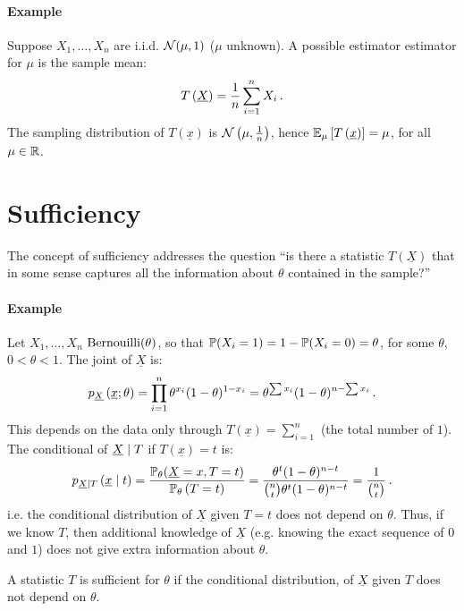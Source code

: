 
\paragraph{Example}

Suppose $X_1, \dotsc, X_n$ are i.i.d. $\mathcal{N}(\mu, 1)$ ($\mu$ unknown). A possible estimator estimator for $\mu$ is the sample mean:
\[
 T\left(\underline{X}\right) = \frac{1}{n}\sum_{i=1}^n X_i \, {.}
\]
The sampling distribution of $T\left(\underline{x}\right)$ is $\mathcal{N}\left(\mu, \frac{1}{n}\right)$, hence $\mathbb{E}_\mu \left[ T\left(\underline{x}\right) \right] = \mu$, for all $\mu \in \mathbb{R}$.

\section{Sufficiency}
The concept of sufficiency addresses the question ``is there a statistic $T\left(\underline{X}\right)$ that in some sense captures all the information about $\theta$ contained in the sample?''

\paragraph{Example\label{example:1.2}}

Let $X_1, \dotsc, X_n$ \iid $\text{Bernouilli}(\theta)$, so that $\mathbb{P}(X_i = 1) = 1 - \mathbb{P}(X_i = 0) = \theta$, for some $\theta$, $0 < \theta < 1$. The joint \pmf of $\underline{X}$ is:
\[
p_{\underline{X}}\left(\underline{x}; \theta\right) = \prod_{i = 1}^n \theta^{x_i}(1-\theta)^{1-x_i} = \theta^{\sum x_i}(1 - \theta)^{n - \sum x_i} \, {.}
\]
This depends on the data only through $T\left(\underline{x}\right) = \sum_{i=1}^n$ (the total number of $1$). The conditional \pmf of $\underline{X} \mid T$ if $T\left(\underline{x}\right) = t$ is:
\[
p_{\underline{X} \mid T} \left( \underline{x} \mid t\right) = \frac{\mathbb{P}_\theta(\underline{X} = x, T = t)}{\mathbb{P}_\theta\left(T = t\right)} = \frac{\theta^t(1-\theta)^{n-t}}{\binom{n}{t}\theta^t(1-\theta)^{n-t}} = \frac{1}{\binom{n}{t}} \, {.}
\]
i.e. the conditional distribution of $\underline{X}$ given $T = t$ does not depend on $\theta$. Thus, if we know $T$, then additional knowledge of $\underline{X}$ (e.g. knowing the exact sequence of $0$ and $1$) does not give extra information about $\theta$. 

\begin{definition}
  A statistic $T$ is sufficient for $\theta$ if the conditional distribution, of $\underline{X}$ given $T$ does not depend on $\theta$.
\end{definition}

